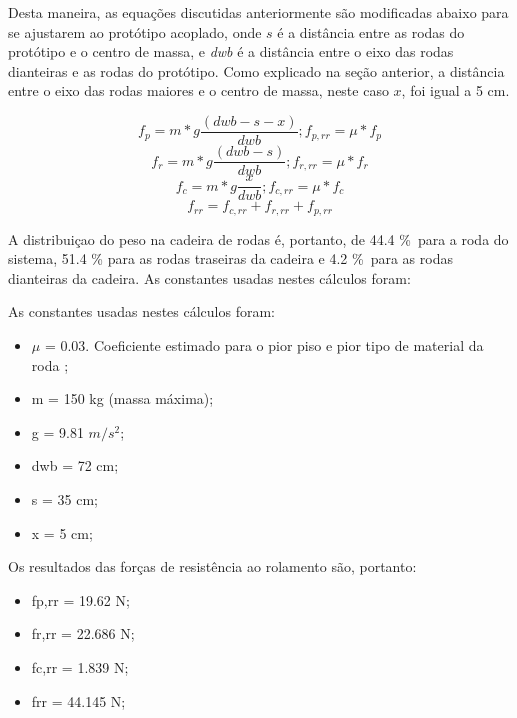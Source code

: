 Desta maneira, as equações discutidas anteriormente são modificadas abaixo para se ajustarem ao protótipo acoplado, onde $s$ é a distância entre as rodas do protótipo e o centro de massa, e \textit{dwb} é a distância entre o eixo das rodas dianteiras e as rodas do protótipo. Como explicado na seção anterior, a distância entre o eixo das rodas maiores e o centro de massa, neste caso $x$, foi igual a 5 cm.

\begin{equation}
	f_p=m*g\frac{(dwb-s-x)}{dwb} ; f_{p,rr}=\mu*f_p
\end{equation}
\begin{equation}
	f_r=m*g\frac{(dwb-s)}{dwb} ; f_{r,rr}=\mu*f_r
\end{equation}
\begin{equation}
	f_c=m*g\frac{x}{dwb} ; f_{c,rr}=\mu*f_c
\end{equation}
\begin{equation}
	f_{rr}=f_{c,rr}+f_{r,rr}+f_{p,rr}
\end{equation}

A distribuiçao do peso na cadeira de rodas é, portanto, de 44.4 \%\ para a roda do sistema, 51.4 \% para as rodas traseiras da cadeira e 4.2 \%\ para as rodas dianteiras da cadeira. As constantes usadas nestes cálculos foram:

As constantes usadas nestes cálculos foram:


\begin{itemize}
	\item $\mu$ = 0.03. Coeficiente estimado para o pior piso e pior tipo de material da roda \cite{rolling_resistance};
	\item m = 150 kg (massa máxima);
	\item g = 9.81 $m/s^2$;
	\item dwb = 72 cm;
	\item s = 35 cm;
	\item x = 5 cm;
\end{itemize}

Os resultados das forças de resistência ao rolamento são, portanto:

\begin{itemize}
	\item fp,rr = 19.62 N;
	\item fr,rr = 22.686 N;
	\item fc,rr = 1.839 N;
	\item frr = 44.145 N;
\end{itemize}

